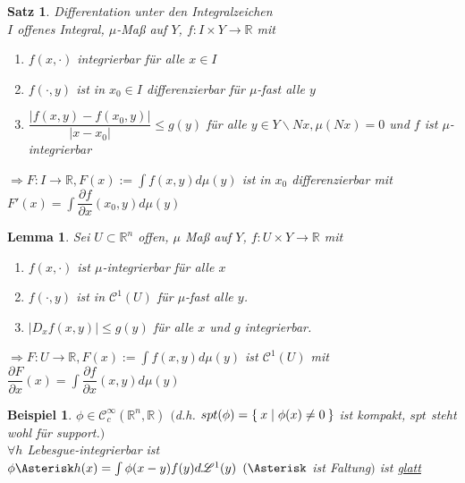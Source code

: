 \documentclass[11pt]{memoir}
\theoremstyle{changebreak}
\newtheorem{Beispiel}{Beispiel}[chapter]
\newtheorem{Lemma}{Lemma}[chapter]
\newtheorem{Satz}{Satz}[chapter]
\begin{document}
\begin{Satz}
\emph{Differentation unter den Integralzeichen} \\
$I$ offenes Integral, $\mu$-Maß auf $Y$, $f: I \times Y \rightarrow \mathbb R$ mit
\begin{enumerate}
	\item $f(x, \cdotp)$ integrierbar für alle $x \in I$
	\item $f(\cdotp, y)$ ist in $x_0 \in I$ differenzierbar für $\mu$-fast alle $y$
	\item $\dfrac{|f(x, y) - f(x_0, y)|}{|x - x_0|} \leq g(y)$ für alle $y \in Y \backslash Nx, \mu(Nx)= 0$ und $f$ ist $\mu$-integrierbar \\
\end{enumerate}
$\Rightarrow F: I \rightarrow \mathbb R, F(x):= \int f(x, y)d\mu(y)$ ist in $x_0$ differenzierbar mit $ F'(x) = \int \dfrac{\partial f}{\partial x}(x_0, y) d\mu(y)$

\end{Satz}

\begin{Lemma}
Sei $U \subset \mathbb R^n$ offen, $\mu$ Maß auf $Y$, $f: U \times Y \rightarrow \mathbb R$ mit
\begin{enumerate}
	\item $f(x, \cdotp)$ ist $\mu$-integrierbar für alle $x$
	\item $f(\cdotp, y)$ ist in $\mathscr C^1(U)$ für $\mu$-fast alle $y$.
	\item $|D_x f(x, y)| \leq g(y)$ für alle $x$ und $g$ integrierbar.
\end{enumerate}
$\Rightarrow F: U \rightarrow \mathbb R, F(x):= \int f(x, y) d\mu(y)$ ist $\mathscr C^1(U)$ mit $\dfrac{\partial F}{\partial x}(x) = \int \dfrac{\partial f}{\partial x}(x, y) d\mu(y)$
\end{Lemma}

\begin{Beispiel}
$\phi \in \mathscr C_c^\infty(\mathbb R^n, \mathbb R)$ $($d.h. $spt(\phi) =\Set{x| \phi(x) \ne 0}$ ist kompakt, $spt$ steht wohl für support.$)$  \\
$\forall h$ Lebesgue-integrierbar ist \\
$\phi \Asterisk h(x) = \int \phi(x-y)f(y) d\mathscr L^1(y)$ $(\Asterisk$ ist \emph{Faltung}$)$ ist \underline{glatt}
\end{Beispiel}
\end{document}
